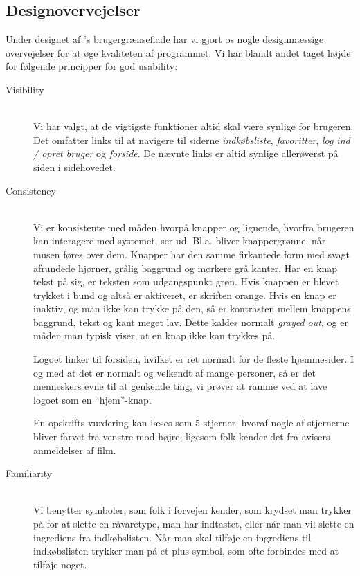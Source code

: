 \subsection{Designovervejelser}
\label{subsec:designovervejelser}

Under designet af \Foodl{}'s brugergrænseflade har vi gjort os nogle designmæssige overvejelser for at øge kvaliteten af programmet. Vi har blandt andet taget højde for følgende principper for god usability\cite[p.~90]{deb}:

\begin{description}
\item[Visibility] \hfill \\
Vi har valgt, at de vigtigste funktioner altid skal være synlige for brugeren. Det omfatter links til at navigere til siderne \textit{indkøbsliste}, \textit{favoritter}, \textit{log ind / opret bruger} og \textit{forside}. De nævnte links er altid synlige allerøverst på siden i sidehovedet.
 
\item[Consistency] \hfill \\
Vi er konsistente med måden hvorpå knapper og lignende, hvorfra brugeren kan interagere med systemet, ser ud. Bl.a. bliver knappergrønne, når musen føres over dem. Knapper har den samme firkantede form med svagt afrundede hjørner, grålig baggrund og mørkere grå kanter. Har en knap tekst på sig, er teksten som udgangspunkt grøn. Hvis knappen er blevet trykket i bund og altså er aktiveret, er skriften orange. Hvis en knap er inaktiv, og man ikke kan trykke på den, så er kontrasten mellem knappens baggrund, tekst og kant meget lav. Dette kaldes normalt \textit{grayed out}, og er måden man typisk viser, at en knap ikke kan trykkes på.

Logoet linker til forsiden, hvilket er ret normalt for de fleste hjemmesider. I og med at det er normalt og velkendt af mange personer, så er det menneskers evne til at genkende ting, vi prøver at ramme ved at lave logoet som en ``hjem''-knap.

En opskrifts vurdering kan læses som 5 stjerner, hvoraf nogle af stjernerne bliver farvet fra venstre mod højre, ligesom folk kender det fra \fx avisers anmeldelser af film.

\item[Familiarity] \hfill \\
Vi benytter symboler, som folk i forvejen kender, som \fx krydset man trykker på for at slette en råvaretype, man har indtastet, eller når man vil slette en ingrediens fra indkøbslisten. Når man skal tilføje en ingrediens til indkøbslisten trykker man på et plus-symbol, som ofte forbindes med at tilføje noget.


\end{description}
